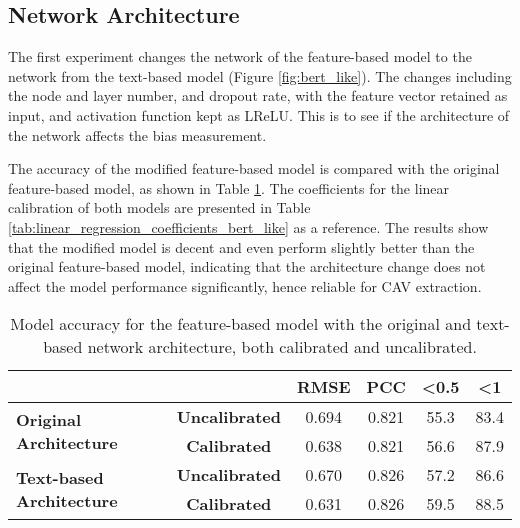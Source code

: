 \subsection{Network Architecture} \label{sec:network_architecture}
The first experiment changes the network of the feature-based model to the network from the text-based model (Figure \ref{fig:bert_like}). The changes including the node and layer number, and dropout rate, with the feature vector retained as input, and activation function kept as LReLU. This is to see if the architecture of the network affects the bias measurement.

The accuracy of the modified feature-based model is compared with the original feature-based model, as shown in Table \ref{tab:model_accuracy_bert_like}. The coefficients for the linear calibration of both models are presented in Table \ref{tab:linear_regression_coefficients_bert_like} as a reference. The results show that the modified model is decent and even perform slightly better than the original feature-based model, indicating that the architecture change does not affect the model performance significantly, hence reliable for CAV extraction.

\begin{table}[H]
    \centering
    \begin{tabular}{|lc|c|c|c|c|}
        \hline
        \multicolumn{2}{|l|}{\textbf{}}                                         & \textbf{RMSE}         & \textbf{PCC} & \textbf{\textless 0.5} & \textbf{\textless 1}        \\ \hline
        \multicolumn{1}{|l|}{\multirow{2}{*}{\textbf{Original Architecture}}}   & \textbf{Uncalibrated} & 0.694        & 0.821                  & 55.3                 & 83.4 \\ \cline{2-6}
        \multicolumn{1}{|l|}{}                                                  & \textbf{Calibrated}   & 0.638        & 0.821                  & 56.6                 & 87.9 \\ \hline
        \multicolumn{1}{|l|}{\multirow{2}{*}{\textbf{Text-based Architecture}}} & \textbf{Uncalibrated} & 0.670        & 0.826                  & 57.2                 & 86.6 \\ \cline{2-6}
        \multicolumn{1}{|l|}{}                                                  & \textbf{Calibrated}   & 0.631        & 0.826                  & 59.5                 & 88.5 \\ \hline
    \end{tabular}
    \caption{Model accuracy for the feature-based model with the original and text-based network architecture, both calibrated and uncalibrated.}
    \label{tab:model_accuracy_bert_like}
\end{table}


